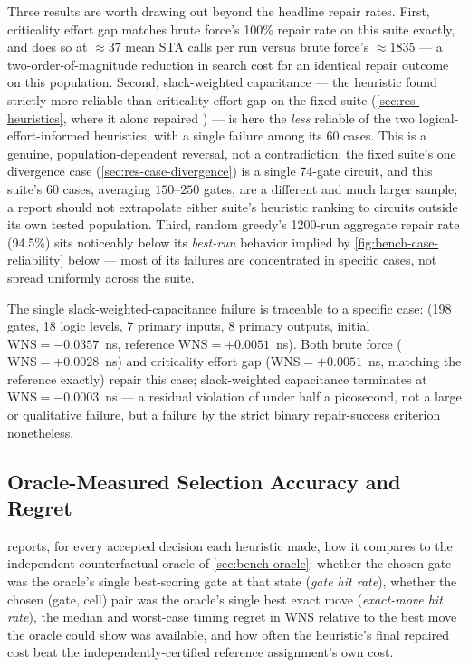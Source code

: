 Three results are worth drawing out beyond the headline repair rates.
First, criticality effort gap matches brute force's 100\% repair rate on
this suite exactly, and does so at $\approx 37$ mean STA calls per run
versus brute force's $\approx 1835$ --- a two-order-of-magnitude reduction
in search cost for an identical repair outcome on this population. Second,
slack-weighted capacitance --- the heuristic found strictly more reliable
than criticality effort gap on the fixed suite (\cref{sec:res-heuristics},
where it alone repaired ) --- is
here the \emph{less} reliable of the two logical-effort-informed
heuristics, with a single failure among its 60 cases. This is a genuine,
population-dependent reversal, not a contradiction: the fixed suite's
one divergence case (\cref{sec:res-case-divergence}) is a single 74-gate
circuit, and this suite's 60 cases, averaging $150$--$250$ gates, are a
different and much larger sample; a report should not extrapolate either
suite's heuristic ranking to circuits outside its own tested population.
Third, random greedy's 1200-run aggregate repair rate (94.5\%) sits
noticeably below its \emph{best-run} behavior implied by
\cref{fig:bench-case-reliability} below --- most of its failures are
concentrated in specific cases, not spread uniformly across the suite.
 
The single slack-weighted-capacitance failure is traceable to a specific
case:  (198 gates, 18 logic levels, 7 primary inputs, 8
primary outputs, initial $\mathrm{WNS}=-0.0357$~ns, reference
$\mathrm{WNS}=+0.0051$~ns). Both brute force ($\mathrm{WNS}=+0.0028$~ns)
and criticality effort gap ($\mathrm{WNS}=+0.0051$~ns, matching the
reference exactly) repair this case; slack-weighted capacitance terminates
 at $\mathrm{WNS}=-0.0003$~ns --- a residual
violation of under half a picosecond, not a large or qualitative failure,
but a failure by the strict binary repair-success criterion nonetheless.
 
\subsection{Oracle-Measured Selection Accuracy and Regret}
\label{sec:res-bench-oracle}
 
 reports, for every accepted decision each
heuristic made, how it compares to the independent counterfactual oracle
of \cref{sec:bench-oracle}: whether the chosen gate was the oracle's
single best-scoring gate at that state (\emph{gate hit rate}), whether the
chosen (gate, cell) pair was the oracle's single best exact move
(\emph{exact-move hit rate}), the median and worst-case timing regret in
WNS relative to the best move the oracle could show was available, and how
often the heuristic's final repaired cost beat the independently-certified
reference assignment's own cost.
 
